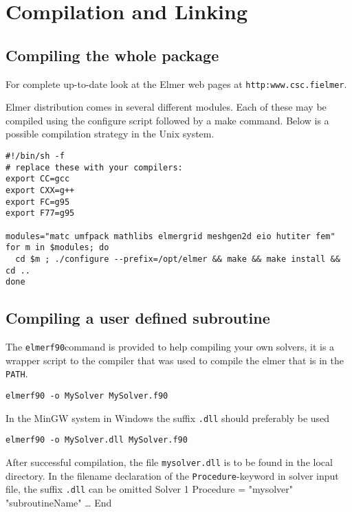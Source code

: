 \chapter{Compilation and Linking}

\section{Compiling the whole package}

For complete up-to-date  look at the Elmer web pages at
\texttt{http:\/\/www.csc.fi\/elmer}. 

Elmer distribution comes in several different modules. Each of these may be compiled using
the configure script followed by a make command. 
Below is a possible compilation strategy in the Unix system. 
\begin{verbatim}
#!/bin/sh -f
# replace these with your compilers:
export CC=gcc
export CXX=g++
export FC=g95
export F77=g95

modules="matc umfpack mathlibs elmergrid meshgen2d eio hutiter fem" 
for m in $modules; do
  cd $m ; ./configure --prefix=/opt/elmer && make && make install && cd .. 
done
\end{verbatim}

\section{Compiling a user defined subroutine}

The \texttt{elmerf90}command is provided to help compiling your own solvers, it is a wrapper script to the 
compiler that was used to compile the elmer that is in the \texttt{PATH}.
\begin{verbatim}
elmerf90 -o MySolver MySolver.f90
\end{verbatim}
In the MinGW system in Windows the suffix \texttt{.dll} should preferably be used
\begin{verbatim}
elmerf90 -o MySolver.dll MySolver.f90
\end{verbatim}

After successful compilation, the file \texttt{mysolver.dll} is to be found in the local directory. 
In the filename declaration of the \texttt{Procedure}-keyword in solver input file, the suffix \texttt{.dll} can be omitted
\ttbegin
Solver 1
  Procedure = "mysolver" "subroutineName"
  \ldots
End
\ttend

